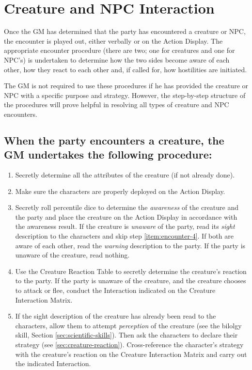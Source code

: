 \section{Creature and NPC Interaction }
\label{sec:creature-npc-interaction}



Once the GM has determined that the party has encountered a creature
or NPC, the encounter is played out, either verbally or on the Action
Display. The appropriate encounter procedure (there are two; one for
creatures and one for NPC's) is undertaken to determine how the two
sides become aware of each other, how they react to each other and, if
called for, how hostilities are initiated.

The GM is not required to use these procedures if he has provided the
creature or NPC with a specific purpose and strategy. However, the
step-by-step structure of the procedures will prove helpful in
resolving all types of creature and NPC encounters.

\subsection[Encounter Procedure]{When the party encounters a creature,
  the GM undertakes the following procedure:} 
\label{sec:encounter-procedure}

\begin{enumerate}
\item Secretly determine all the attributes of the creature (if not
  already done).
\item Make sure the characters are properly deployed on the Action
  Display.
\item Secretly roll percentile dice to determine the \emph{awareness}
  of the creature and the party and place the creature on the Action
  Display in accordance with the awareness result. If the creature is
  \emph{unaware} of the party, read its \emph{sight} description to
  the characters and skip step \ref{item:encounter-4}. If both are aware of each
  other, read the \emph{warning} description to the party. If the
  party is unaware of the creature, read nothing.
\item Use the Creature Reaction Table to secretly determine the
  creature's reaction to the party. If the party is unaware of the
  creature, and the creature chooses to attack or flee, conduct the
  Interaction indicated on the Creature Interaction
  Matrix.\label{item:encounter-4}
\item If the sight description of the creature has already been read
  to the characters, allow them to attempt \emph{perception} of the
  creature (see the bilolgy skill, Section
  \ref{sec:scientific-skills}).
Then ask the characters to declare their strategy (see
  \ref{sec:creature-reaction}). Cross-reference the character's
  strategy with the creature's reaction on the Creature Interaction
  Matrix and carry out the indicated Interaction.\label{item:encounter-5}
\end{enumerate}

